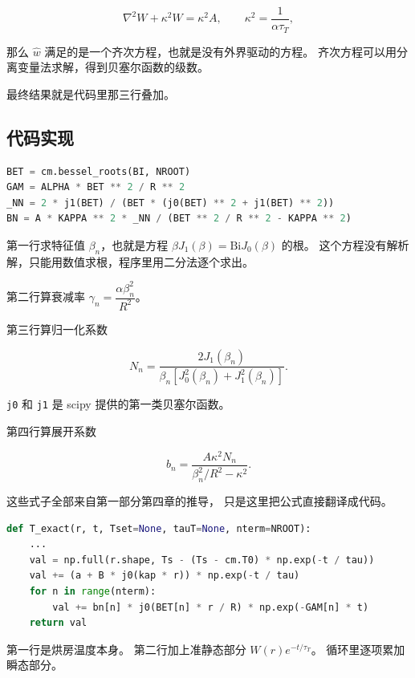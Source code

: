 \begin{equation}
\nabla^2W+\kappa^2W=\kappa^2A,\qquad \kappa^2=\frac{1}{\alpha\tau_T},
\end{equation}

那么 $\hat w$ 满足的是一个齐次方程，也就是没有外界驱动的方程。
齐次方程可以用分离变量法求解，得到贝塞尔函数的级数。

最终结果就是代码里那三行叠加。

\subsection{代码实现}

\begin{lstlisting}[language=Python]
BET = cm.bessel_roots(BI, NROOT)
GAM = ALPHA * BET ** 2 / R ** 2
_NN = 2 * j1(BET) / (BET * (j0(BET) ** 2 + j1(BET) ** 2))
BN = A * KAPPA ** 2 * _NN / (BET ** 2 / R ** 2 - KAPPA ** 2)
\end{lstlisting}

第一行求特征值 $\beta_n$，也就是方程 $\beta J_1(\beta)=\mathrm{Bi}J_0(\beta)$ 的根。
这个方程没有解析解，只能用数值求根，程序里用二分法逐个求出。

第二行算衰减率 $\gamma_n=\dfrac{\alpha\beta_n^2}{R^2}$。

第三行算归一化系数

\begin{equation}
N_n=\frac{2J_1(\beta_n)}{\beta_n\left[J_0^2(\beta_n)+J_1^2(\beta_n)\right]}.
\end{equation}

\texttt{j0} 和 \texttt{j1} 是 scipy 提供的第一类贝塞尔函数。

第四行算展开系数

\begin{equation}
b_n=\frac{A\kappa^2N_n}{\beta_n^2/R^2-\kappa^2}.
\end{equation}

这些式子全部来自第一部分第四章的推导，
只是这里把公式直接翻译成代码。

\begin{lstlisting}[language=Python]
def T_exact(r, t, Tset=None, tauT=None, nterm=NROOT):
    ...
    val = np.full(r.shape, Ts - (Ts - cm.T0) * np.exp(-t / tau))
    val += (a + B * j0(kap * r)) * np.exp(-t / tau)
    for n in range(nterm):
        val += bn[n] * j0(BET[n] * r / R) * np.exp(-GAM[n] * t)
    return val
\end{lstlisting}

第一行是烘房温度本身。
第二行加上准静态部分 $W(r)e^{-t/\tau_T}$。
循环里逐项累加瞬态部分。

